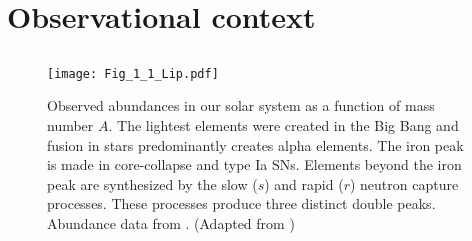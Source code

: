 \section{Observational context}


\subsection{\rproc{} \nuc{}}\label{sec:intro:nucleo}

%

\begin{figure}[t]
    \centering
    \texttt{[image: Fig\_1\_1\_Lip.pdf]}
    \caption{Observed abundances in our solar system as a function of mass number
        $A$. The lightest elements were created in the Big Bang and fusion in stars predominantly
        creates alpha elements. The iron peak is made in core-collapse and type
        Ia \acp{SN}. Elements beyond the iron peak are synthesized by the slow ($s$) and
        rapid ($r$) neutron capture processes. These processes produce three distinct double
        peaks. Abundance data from \citet{Lodders:2003}. (Adapted from \citet{Lippuner:2018phd})
    }
    \label{fig:nuc:fig11_lip}
\end{figure}


